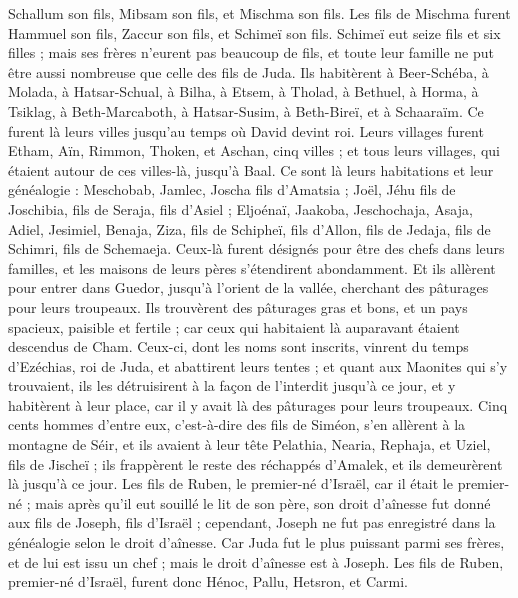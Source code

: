 \begin{multicols}{2}
Schallum son fils, Mibsam son fils, et Mischma son fils.
Les fils de Mischma furent Hammuel son fils, Zaccur son fils, et Schimeï son fils.
Schimeï eut seize fils et six filles ; mais ses frères n'eurent pas beaucoup de fils, et toute leur famille ne put être aussi nombreuse que celle des fils de Juda.
Ils habitèrent à Beer-Schéba, à Molada, à Hatsar-Schual,
à Bilha, à Etsem, à Tholad,
à Bethuel, à Horma, à Tsiklag,
à Beth-Marcaboth, à Hatsar-Susim, à Beth-Bireï, et à Schaaraïm. Ce furent là leurs villes jusqu'au temps où David devint roi.
Leurs villages furent Etham, Aïn, Rimmon, Thoken, et Aschan, cinq villes ;
et tous leurs villages, qui étaient autour de ces villes-là, jusqu'à Baal. Ce sont là leurs habitations et leur généalogie :
Meschobab, Jamlec, Joscha fils d'Amatsia ;
Joël, Jéhu fils de Joschibia, fils de Seraja, fils d'Asiel ;
Eljoénaï, Jaakoba, Jeschochaja, Asaja, Adiel, Jesimiel, Benaja,
Ziza, fils de Schipheï, fils d'Allon, fils de Jedaja, fils de Schimri, fils de Schemaeja.
Ceux-là furent désignés pour être des chefs dans leurs familles, et les maisons de leurs pères s'étendirent abondamment.
Et ils allèrent pour entrer dans Guedor, jusqu'à l'orient de la vallée, cherchant des pâturages pour leurs troupeaux.
Ils trouvèrent des pâturages gras et bons, et un pays spacieux, paisible et fertile ; car ceux qui habitaient là auparavant étaient descendus de Cham.
Ceux-ci, dont les noms sont inscrits, vinrent du temps d'Ezéchias, roi de Juda, et abattirent leurs tentes ; et quant aux Maonites qui s'y trouvaient, ils les détruisirent à la façon de l'interdit jusqu'à ce jour, et y habitèrent à leur place, car il y avait là des pâturages pour leurs troupeaux.
Cinq cents hommes d'entre eux, c'est-à-dire des fils de Siméon, s'en allèrent à la montagne de Séir, et ils avaient à leur tête Pelathia, Nearia, Rephaja, et Uziel, fils de Jischeï ;
ils frappèrent le reste des réchappés d'Amalek, et ils demeurèrent là jusqu'à ce jour.
\VerseOne{}Les fils de Ruben, le premier-né d'Israël, car il était le premier-né ; mais après qu'il eut souillé le lit de son père, son droit d'aînesse fut donné aux fils de Joseph, fils d'Israël ; cependant, Joseph ne fut pas enregistré dans la généalogie selon le droit d'aînesse.
Car Juda fut le plus puissant parmi ses frères, et de lui est issu un chef ; mais le droit d'aînesse est à Joseph.
Les fils de Ruben, premier-né d'Israël, furent donc Hénoc, Pallu, Hetsron, et Carmi.

\end{multicols}
